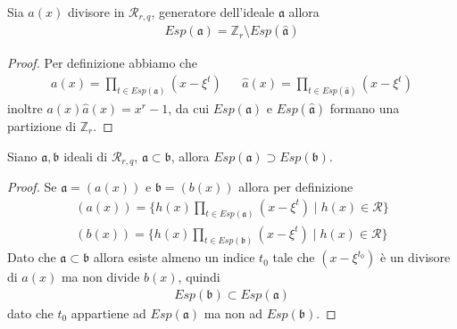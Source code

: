 \begin{prop}
   Sia $a(x)$ divisore in $\mathcal{R}_{r,q}$, generatore dell'ideale $\mathfrak{a}$ allora
   \begin{align*}
      Esp(\mathfrak{a}) = \mathbb{Z}_{r} \setminus Esp(\hat{\mathfrak{a}})
   \end{align*}
\end{prop}
\begin{proof}
   Per definizione abbiamo che
   \begin{align*}
      a(x) = \prod_{ t \in Esp(\mathfrak{a}) } (x - \xi^{t})
      & &
      \hat{a}(x) = \prod_{ t \in Esp(\hat{\mathfrak{a}}) } (x - \xi^{t})
   \end{align*}
   inoltre $a(x) \hat{a}(x) = x^r-1$, da cui $Esp(\mathfrak{a})$ e $Esp(\hat{\mathfrak{a}}) $ formano una partizione di $\mathbb{Z}_{r}$.
\end{proof}
\begin{prop}
   Siano $\mathfrak{a}, \mathfrak{b}$ ideali di $\mathcal{R}_{r,q}$, $\mathfrak{a} \subset \mathfrak{b}$, allora
   $Esp(\mathfrak{a}) \supset Esp(\mathfrak{b})$.
\end{prop}
\begin{proof}
   Se $\mathfrak{a} = (a(x))$ e $\mathfrak{b} = (b(x))$ allora per definizione
   \begin{align*}
      (a(x))
      = \lbrace h(x)\prod_{ t \in Esp(\mathfrak{a}) } (x - \xi^{t}) \mid h(x) \in \mathcal{R} \rbrace
      \\
      (b(x))
      = \lbrace h(x)\prod_{ t \in Esp(\mathfrak{b}) } (x - \xi^{t}) \mid h(x) \in \mathcal{R} \rbrace
   \end{align*}
   Dato che $\mathfrak{a} \subset \mathfrak{b}$ allora esiste almeno un indice $t_{0}$ tale che $(x - \xi^{t_{0}}) $ è un divisore di $a(x)$ ma non divide $b(x)$, quindi
   \begin{align*}
      Esp(\mathfrak{b}) \subset Esp(\mathfrak{a})
   \end{align*}
   dato che $t_{0}$ appartiene ad $Esp(\mathfrak{a})$ ma non ad $Esp(\mathfrak{b})$.
\end{proof}

